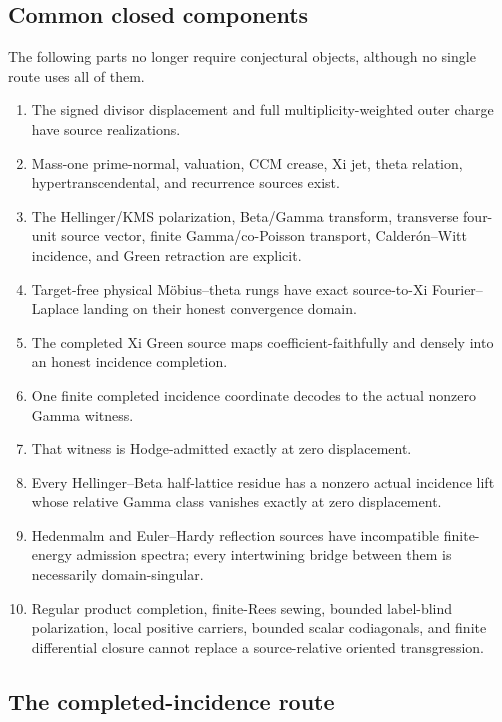 \documentclass[11pt]{article}
\theoremstyle{definition}
\theoremstyle{remark}
\begin{document}
\subsection{Common closed components}

The following parts no longer require conjectural objects, although no
single route uses all of them.
\begin{enumerate}[leftmargin=2.2em]
\item The signed divisor displacement and full multiplicity-weighted
      outer charge have source realizations.
\item Mass-one prime-normal, valuation, CCM crease, Xi jet, theta
      relation, hypertranscendental, and recurrence sources exist.
\item The Hellinger/KMS polarization, Beta/Gamma transform, transverse
      four-unit source vector, finite Gamma/co-Poisson transport,
      Calder\'on--Witt incidence, and Green retraction are explicit.
\item Target-free physical M\"obius--theta rungs have exact
      source-to-Xi Fourier--Laplace landing on their honest convergence
      domain.
\item The completed Xi Green source maps coefficient-faithfully and
      densely into an honest incidence completion.
\item One finite completed incidence coordinate decodes to the actual
      nonzero Gamma witness.
\item That witness is Hodge-admitted exactly at zero displacement.
\item Every Hellinger--Beta half-lattice residue has a nonzero actual
      incidence lift whose relative Gamma class vanishes exactly at zero
      displacement.
\item Hedenmalm and Euler--Hardy reflection sources have incompatible
      finite-energy admission spectra; every intertwining bridge between
      them is necessarily domain-singular.
\item Regular product completion, finite-Rees sewing, bounded
      label-blind polarization, local positive carriers, bounded scalar
      codiagonals, and finite differential closure cannot replace a
      source-relative oriented transgression.
\end{enumerate}

\subsection{The completed-incidence route}
\end{document}
